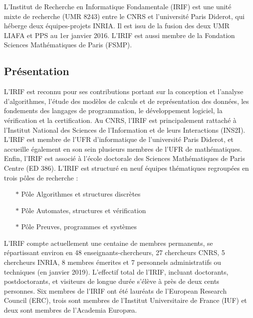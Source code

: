 \documentclass{article}
\begin{document}
L'Institut de Recherche en Informatique Fondamentale (IRIF) est une unité mixte de recherche (UMR 8243) entre le CNRS et l'université Paris Diderot, qui héberge deux équipes-projets INRIA. Il est issu de la fusion des deux UMR LIAFA et PPS au 1er janvier 2016. L'IRIF est aussi membre de la Fondation Sciences Mathématiques de Paris (FSMP). 

\subsection{Présentation}

L’IRIF est reconnu pour ses contributions portant sur la conception et l’analyse d’algorithmes, l’étude des modèles de calculs et de représentation des données, les fondements des langages de programmation, le développement logiciel, la vérification et la certification.
\newline\newline
Au CNRS, l'IRIF est principalement rattaché à l'Institut National des Sciences de l'Information et de leurs Interactions (INS2I). L'IRIF est membre de l'UFR d'informatique de l'université Paris Diderot, et accueille également en son sein plusieurs membres de l'UFR de mathématiques. Enfin, l'IRIF est associé à l'école doctorale des Sciences Mathématiques de Paris Centre (ED 386).
\newline\newline
L'IRIF est structuré en neuf équipes thématiques regroupées en trois pôles de recherche :
	\begin{itemize}
		\item[$\ast$]Pôle Algorithmes et structures discrètes
		\item[$\ast$]Pôle Automates, structures et vérification
		\item[$\ast$]Pôle Preuves, programmes et systèmes
	\end{itemize}
L'IRIF compte actuellement une centaine de membres permanents, se répartissant environ en 48 enseignants-chercheurs, 27 chercheurs CNRS, 5 chercheurs INRIA, 8 membres émerites et 7 personnels administratifs ou techniques (en janvier 2019). L'effectif total de l'IRIF, incluant doctorants, postdoctorants, et visiteurs de longue durée s'élève à près de deux cents personnes.
\newline\newline
Six membres de l'IRIF ont été lauréats de l'European Research Council (ERC), trois sont membres de l'Institut Universitaire de France (IUF) et deux sont membres de l'Academia Europæa.
\end{document}
